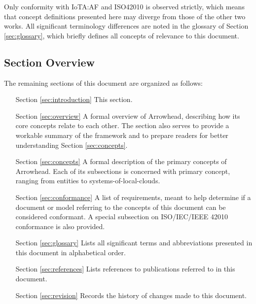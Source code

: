 Only conformity with IoTA:AF and ISO42010 is observed strictly, which means that concept definitions presented here may diverge from those of the other two works.
All significant terminology differences are noted in the glossary of Section \ref{sec:glossary}, which briefly defines all concepts of relevance to this document.

\subsection{Section Overview}
\label{sec:introduction:sections}

The remaining sections of this document are organized as follows:
\vspace*{2mm}
\begin{itemize}[leftmargin=2cm,rightmargin=0pt,labelwidth=2cm,labelsep=0pt,itemindent=0pt,parsep=0.1cm,topsep=0.1cm,align=left]

\item[Section \ref{sec:introduction}]
This section.

\item[Section \ref{sec:overview}]
A formal overview of Arrowhead, describing how its core concepts relate to each other.
The section also serves to provide a workable summary of the framework and to prepare readers for better understanding Section \ref{sec:concepts}.

\item[Section \ref{sec:concepts}]
A formal description of the primary concepts of Arrowhead.
Each of its subsections is concerned with primary concept, ranging from entities to systems-of-local-clouds.

\item[Section \ref{sec:conformance}]
A list of requirements, meant to help determine if a document or model referring to the concepts of this document can be considered conformant.
A special subsection on ISO/IEC/IEEE 42010 conformance is also provided.

\item[Section \ref{sec:glossary}]
Lists all significant terms and abbreviations presented in this document in alphabetical order.

\item[Section \ref{sec:references}]
Lists references to publications referred to in this document.

\item[Section \ref{sec:revision}]
Records the history of changes made to this document.

\end{itemize}
